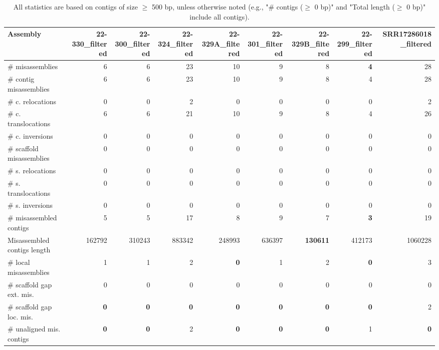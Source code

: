 \documentclass[12pt,a4paper]{article}
\begin{document}
\begin{table}[ht]
\begin{center}
\caption{All statistics are based on contigs of size $\geq$ 500 bp, unless otherwise noted (e.g., "\# contigs ($\geq$ 0 bp)" and "Total length ($\geq$ 0 bp)" include all contigs).}
\begin{tabular}{|l*{8}{|r}|}
\hline
Assembly & 22-330\_filtered & 22-300\_filtered & 22-324\_filtered & 22-329A\_filtered & 22-301\_filtered & 22-329B\_filtered & 22-299\_filtered & SRR17286018\_filtered \\ \hline
\# misassemblies & 6 & 6 & 23 & 10 & 9 & 8 & {\bf 4} & 28 \\ \hline
\hspace{2mm}\# contig misassemblies & 6 & 6 & 23 & 10 & 9 & 8 & 4 & 28 \\ \hline
\hspace{5mm}\# c. relocations & 0 & 0 & 2 & 0 & 0 & 0 & 0 & 2 \\ \hline
\hspace{5mm}\# c. translocations & 6 & 6 & 21 & 10 & 9 & 8 & 4 & 26 \\ \hline
\hspace{5mm}\# c. inversions & 0 & 0 & 0 & 0 & 0 & 0 & 0 & 0 \\ \hline
\hspace{2mm}\# scaffold misassemblies & 0 & 0 & 0 & 0 & 0 & 0 & 0 & 0 \\ \hline
\hspace{5mm}\# s. relocations & 0 & 0 & 0 & 0 & 0 & 0 & 0 & 0 \\ \hline
\hspace{5mm}\# s. translocations & 0 & 0 & 0 & 0 & 0 & 0 & 0 & 0 \\ \hline
\hspace{5mm}\# s. inversions & 0 & 0 & 0 & 0 & 0 & 0 & 0 & 0 \\ \hline
\# misassembled contigs & 5 & 5 & 17 & 8 & 9 & 7 & {\bf 3} & 19 \\ \hline
Misassembled contigs length & 162792 & 310243 & 883342 & 248993 & 636397 & {\bf 130611} & 412173 & 1060228 \\ \hline
\# local misassemblies & 1 & 1 & 2 & {\bf 0} & 1 & 2 & {\bf 0} & 3 \\ \hline
\# scaffold gap ext. mis. & 0 & 0 & 0 & 0 & 0 & 0 & 0 & 0 \\ \hline
\# scaffold gap loc. mis. & {\bf 0} & {\bf 0} & {\bf 0} & {\bf 0} & {\bf 0} & {\bf 0} & {\bf 0} & 2 \\ \hline
\# unaligned mis. contigs & {\bf 0} & {\bf 0} & 2 & {\bf 0} & {\bf 0} & {\bf 0} & 1 & {\bf 0} \\ \hline

\end{tabular}
\end{center}
\end{table}
\end{document}
